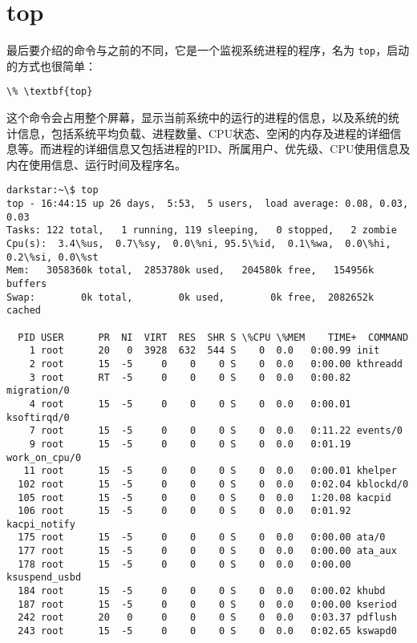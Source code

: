 \section{top}
\label{chap:processControl:top}
最后要介绍的命令与之前的不同，它是一个监视系统进程的程序，名为
\texttt{top}，启动的方式也很简单：
\begin{Verbatim}[frame=single, commandchars=\\\{\}]
\% \textbf{top}
\end{Verbatim}
这个命令会占用整个屏幕，显示当前系统中的运行的进程的信息，以及系统的统
计信息，包括系统平均负载、进程数量、CPU状态、空闲的内存及进程的详细信
息等。而进程的详细信息又包括进程的PID、所属用户、优先级、CPU使用信息及
内在使用信息、运行时间及程序名。
\begin{Verbatim}[frame=single, commandchars=\\\{\}]
darkstar:~\$ top
top - 16:44:15 up 26 days,  5:53,  5 users,  load average: 0.08, 0.03, 0.03
Tasks: 122 total,   1 running, 119 sleeping,   0 stopped,   2 zombie
Cpu(s):  3.4\%us,  0.7\%sy,  0.0\%ni, 95.5\%id,  0.1\%wa,  0.0\%hi,  0.2\%si, 0.0\%st
Mem:   3058360k total,  2853780k used,   204580k free,   154956k buffers
Swap:        0k total,        0k used,        0k free,  2082652k cached

  PID USER      PR  NI  VIRT  RES  SHR S \%CPU \%MEM    TIME+  COMMAND            
    1 root      20   0  3928  632  544 S    0  0.0   0:00.99 init               
    2 root      15  -5     0    0    0 S    0  0.0   0:00.00 kthreadd           
    3 root      RT  -5     0    0    0 S    0  0.0   0:00.82 migration/0        
    4 root      15  -5     0    0    0 S    0  0.0   0:00.01 ksoftirqd/0        
    7 root      15  -5     0    0    0 S    0  0.0   0:11.22 events/0           
    9 root      15  -5     0    0    0 S    0  0.0   0:01.19 work_on_cpu/0      
   11 root      15  -5     0    0    0 S    0  0.0   0:00.01 khelper            
  102 root      15  -5     0    0    0 S    0  0.0   0:02.04 kblockd/0          
  105 root      15  -5     0    0    0 S    0  0.0   1:20.08 kacpid             
  106 root      15  -5     0    0    0 S    0  0.0   0:01.92 kacpi_notify       
  175 root      15  -5     0    0    0 S    0  0.0   0:00.00 ata/0              
  177 root      15  -5     0    0    0 S    0  0.0   0:00.00 ata_aux            
  178 root      15  -5     0    0    0 S    0  0.0   0:00.00 ksuspend_usbd      
  184 root      15  -5     0    0    0 S    0  0.0   0:00.02 khubd              
  187 root      15  -5     0    0    0 S    0  0.0   0:00.00 kseriod            
  242 root      20   0     0    0    0 S    0  0.0   0:03.37 pdflush            
  243 root      15  -5     0    0    0 S    0  0.0   0:02.65 kswapd0
\end{Verbatim}

